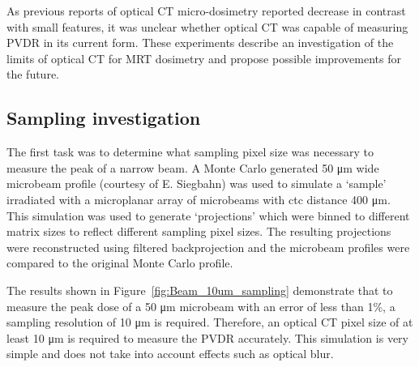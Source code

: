 	As previous reports of optical CT micro-dosimetry reported decrease in contrast with small features, it was unclear whether optical CT was capable of measuring PVDR in its current form. \cite{doranultra-high2013} These experiments describe an investigation of the limits of optical CT for MRT dosimetry  and propose possible improvements for the future. 
	
	
	\subsection{Sampling investigation}
	The first task was to determine what sampling pixel size was necessary to measure the peak of a narrow beam. A Monte Carlo generated 50 \si{\um} wide microbeam profile (courtesy of E. Siegbahn) was used to simulate a   `sample' irradiated with a microplanar array of microbeams with ctc distance 400 \si{\um}. This simulation was used to generate  `projections' which were binned to different matrix sizes to reflect different sampling pixel sizes. The resulting projections were reconstructed using filtered backprojection and the microbeam profiles were compared to the original Monte Carlo profile.
	
	The results shown in Figure~\ref{fig:Beam_10um_sampling} demonstrate  that to measure the peak dose of a 50 \si{\um} microbeam with an error of less than 1\%, a sampling resolution of 10 \si{\um} is required. Therefore, an optical CT pixel size of at least 10 \si{\um} is required to measure the PVDR accurately. This simulation is very simple and does not take into account effects such as optical blur.  
	
